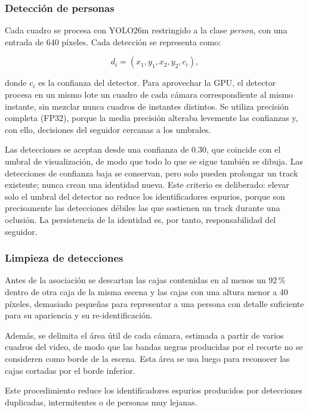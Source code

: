\documentclass[12pt,a4paper]{article}
\begin{document}
\subsubsection{Detección de personas}

Cada cuadro se procesa con YOLO26m restringido a la clase
\textit{person}, con una entrada de 640 píxeles. Cada detección se
representa como:

\begin{equation}
d_i = (x_1,y_1,x_2,y_2,c_i),
\end{equation}

donde $c_i$ es la confianza del detector. Para aprovechar la GPU, el
detector procesa en un mismo lote un cuadro de cada cámara
correspondiente al mismo instante, sin mezclar nunca cuadros de instantes
distintos. Se utiliza precisión completa (FP32), porque la media
precisión alteraba levemente las confianzas y, con ello, decisiones del
seguidor cercanas a los umbrales.

Las detecciones se aceptan desde una confianza de 0.30, que coincide con
el umbral de visualización, de modo que todo lo que se sigue también se
dibuja. Las detecciones de confianza baja se conservan, pero solo pueden
prolongar un track existente; nunca crean una identidad nueva. Este
criterio es deliberado: elevar solo el umbral del detector no reduce los
identificadores espurios, porque son precisamente las detecciones débiles
las que sostienen un track durante una oclusión. La persistencia de la
identidad es, por tanto, responsabilidad del seguidor.

\subsubsection{Limpieza de detecciones}

Antes de la asociación se descartan las cajas contenidas en al menos un
92\,\% dentro de otra caja de la misma escena y las cajas con una altura
menor a 40 píxeles, demasiado pequeñas para representar a una persona
con detalle suficiente para su apariencia y su re-identificación.

Además, se delimita el área útil de cada cámara, estimada a partir de
varios cuadros del video, de modo que las bandas negras producidas por
el recorte no se consideren como borde de la escena. Esta área se usa
luego para reconocer las cajas cortadas por el borde inferior.

Este procedimiento reduce los identificadores espurios producidos por
detecciones duplicadas, intermitentes o de personas muy lejanas.
\end{document}
